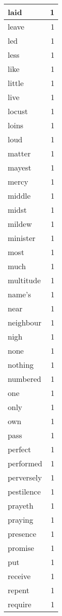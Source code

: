 \begin{center}
\begin{longtable}{l|r}
laid & 1 \\ \hline
leave & 1 \\ \hline
led & 1 \\ \hline
less & 1 \\ \hline
like & 1 \\ \hline
little & 1 \\ \hline
live & 1 \\ \hline
locust & 1 \\ \hline
loins & 1 \\ \hline
loud & 1 \\ \hline
matter & 1 \\ \hline
mayest & 1 \\ \hline
mercy & 1 \\ \hline
middle & 1 \\ \hline
midst & 1 \\ \hline
mildew & 1 \\ \hline
minister & 1 \\ \hline
most & 1 \\ \hline
much & 1 \\ \hline
multitude & 1 \\ \hline
name's & 1 \\ \hline
near & 1 \\ \hline
neighbour & 1 \\ \hline
nigh & 1 \\ \hline
none & 1 \\ \hline
nothing & 1 \\ \hline
numbered & 1 \\ \hline
one & 1 \\ \hline
only & 1 \\ \hline
own & 1 \\ \hline
pass & 1 \\ \hline
perfect & 1 \\ \hline
performed & 1 \\ \hline
perversely & 1 \\ \hline
pestilence & 1 \\ \hline
prayeth & 1 \\ \hline
praying & 1 \\ \hline
presence & 1 \\ \hline
promise & 1 \\ \hline
put & 1 \\ \hline
receive & 1 \\ \hline
repent & 1 \\ \hline
require & 1 \\ \hline

\end{longtable}
\end{center}
